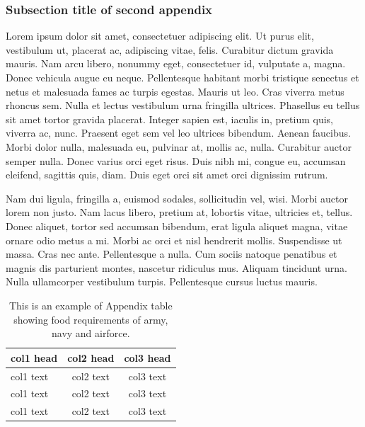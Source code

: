 \documentclass[AMS,STIX2COL]{WileyNJD-v2}
\begin{document}
    \subsubsection{Subsection title of second appendix\label{app2.1.1a}}

    Lorem ipsum dolor sit amet, consectetuer adipiscing elit. Ut purus elit, vestibulum ut, placerat ac, adipiscing vitae,
    felis. Curabitur dictum gravida mauris. Nam arcu libero, nonummy eget, consectetuer id, vulputate a, magna. Donec
    vehicula augue eu neque. Pellentesque habitant morbi tristique senectus et netus et malesuada fames ac turpis egestas.
    Mauris ut leo. Cras viverra metus rhoncus sem. Nulla et lectus vestibulum urna fringilla ultrices. Phasellus eu tellus
    sit amet tortor gravida placerat. Integer sapien est, iaculis in, pretium quis, viverra ac, nunc. Praesent eget sem vel
    leo ultrices bibendum. Aenean faucibus. Morbi dolor nulla, malesuada eu, pulvinar at, mollis ac, nulla. Curabitur
    auctor semper nulla. Donec varius orci eget risus. Duis nibh mi, congue eu, accumsan eleifend, sagittis quis, diam.
    Duis eget orci sit amet orci dignissim rutrum.

    Nam dui ligula, fringilla a, euismod sodales, sollicitudin vel, wisi. Morbi auctor lorem non justo. Nam lacus libero,
    pretium at, lobortis vitae, ultricies et, tellus. Donec aliquet, tortor sed accumsan bibendum, erat ligula aliquet magna,
    vitae ornare odio metus a mi. Morbi ac orci et nisl hendrerit mollis. Suspendisse ut massa. Cras nec ante. Pellentesque
    a nulla. Cum sociis natoque penatibus et magnis dis parturient montes, nascetur ridiculus mus. Aliquam tincidunt
    urna. Nulla ullamcorper vestibulum turpis. Pellentesque cursus luctus mauris.

    \begin{center}
        \begin{table}[b]%
            \centering
            \caption{This is an example of Appendix table showing food requirements of army, navy and airforce.\label{tab4}}%
            \begin{tabular*}{300pt}{@{\extracolsep\fill}lcc@{\extracolsep\fill}}%
                \toprule
                \textbf{col1 head} & \textbf{col2 head} & \textbf{col3 head} \\
                \midrule
                col1 text          & col2 text          & col3 text          \\
                col1 text          & col2 text          & col3 text          \\
                col1 text          & col2 text          & col3 text          \\
                \bottomrule
            \end{tabular*}
        \end{table}
    \end{center}
\end{document}
